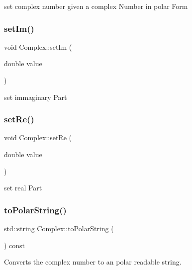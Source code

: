 set complex number given a complex Number in polar Form 

\mbox{\label{class_complex_a6bc88eb16ce2cf081ad0d6c0c5758f11}} 
\subsubsection{\texorpdfstring{set\+Im()}{setIm()}}
{\footnotesize\ttfamily void Complex\+::set\+Im (\begin{DoxyParamCaption}\item[{double}]{value }\end{DoxyParamCaption})}



set immaginary Part 

\mbox{\label{class_complex_af92157b54776656aea634edd4ecac46d}} 
\subsubsection{\texorpdfstring{set\+Re()}{setRe()}}
{\footnotesize\ttfamily void Complex\+::set\+Re (\begin{DoxyParamCaption}\item[{double}]{value }\end{DoxyParamCaption})}



set real Part 

\mbox{\label{class_complex_acbec47c6e4b7538c6f1a1b4234f9cbf7}} 
\subsubsection{\texorpdfstring{to\+Polar\+String()}{toPolarString()}}
{\footnotesize\ttfamily std\+::string Complex\+::to\+Polar\+String (\begin{DoxyParamCaption}{ }\end{DoxyParamCaption}) const}



Converts the complex number to an polar readable string. 

\mbox{\label{class_complex_af125108c8589740c1b9893aaeae8e64b}} 
